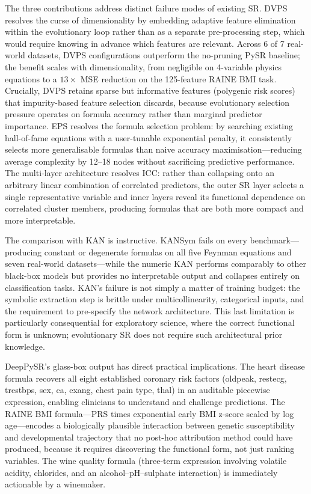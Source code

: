 \documentclass[10pt,twocolumn]{article}
\begin{document}
The three contributions address distinct failure modes of existing SR.  DVPS
resolves the curse of dimensionality by embedding adaptive feature elimination
within the evolutionary loop rather than as a separate pre-processing step,
which would require knowing in advance which features are relevant.  Across
6 of 7 real-world datasets, DVPS configurations outperform the no-pruning
PySR baseline; the benefit scales with dimensionality, from negligible on
4-variable physics equations to a $13\times$ MSE reduction on the 125-feature
RAINE BMI task.  Crucially, DVPS retains sparse but informative features
(polygenic risk scores) that impurity-based feature selection discards, because
evolutionary selection pressure operates on formula accuracy rather than
marginal predictor importance.  EPS resolves the formula selection problem: by
searching existing hall-of-fame equations with a user-tunable exponential
penalty, it consistently selects more generalisable formulas than naive
accuracy maximisation—reducing average complexity by 12–18 nodes without
sacrificing predictive performance.  The multi-layer architecture resolves ICC:
rather than collapsing onto an arbitrary linear combination of correlated
predictors, the outer SR layer selects a single representative variable and
inner layers reveal its functional dependence on correlated cluster members,
producing formulas that are both more compact and more interpretable.

The comparison with KAN is instructive.  KANSym fails on every benchmark—
producing constant or degenerate formulas on all five Feynman equations and
seven real-world datasets—while the numeric KAN performs comparably to other
black-box models but provides no interpretable output and collapses entirely on
classification tasks.  KAN's failure is not simply a matter of training budget:
the symbolic extraction step is brittle under multicollinearity, categorical
inputs, and the requirement to pre-specify the network architecture.  This
last limitation is particularly consequential for exploratory science, where
the correct functional form is unknown; evolutionary SR does not require such
architectural prior knowledge.

DeepPySR's glass-box output has direct practical implications.  The heart
disease formula recovers all eight established coronary risk factors
(oldpeak, restecg, trestbps, sex, ca, exang, chest pain type, thal) in an
auditable piecewise expression, enabling clinicians to understand and challenge
predictions.  The RAINE BMI formula—PRS times exponential early BMI z-score
scaled by log age—encodes a biologically plausible interaction between genetic
susceptibility and developmental trajectory that no post-hoc attribution method
could have produced, because it requires discovering the functional form, not
just ranking variables.  The wine quality formula (three-term expression
involving volatile acidity, chlorides, and an alcohol–pH–sulphate interaction)
is immediately actionable by a winemaker.
\end{document}
